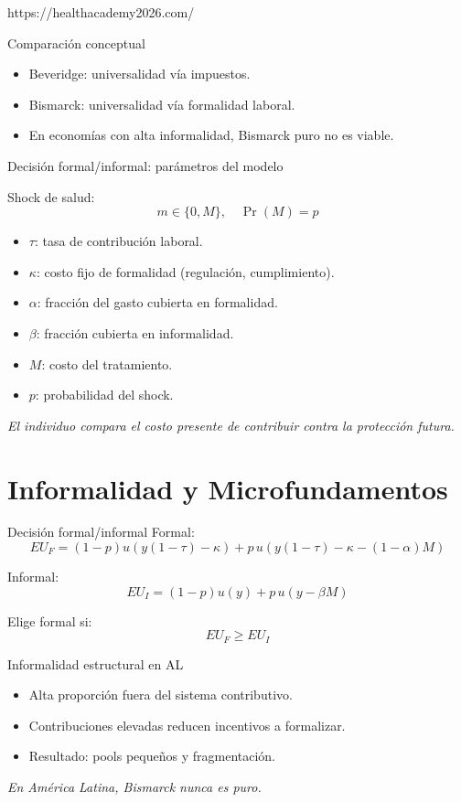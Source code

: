 https://healthacademy2026.com/\documentclass[10pt]{beamer}
\begin{document}
\begin{frame}{Comparación conceptual}
\begin{itemize}
\item Beveridge: universalidad vía impuestos.
\item Bismarck: universalidad vía formalidad laboral.
\item En economías con alta informalidad, Bismarck puro no es viable.
\end{itemize}
\end{frame}
\begin{frame}{Decisión formal/informal: parámetros del modelo}

Shock de salud:
\[
m \in \{0,M\}, \quad \Pr(M)=p
\]

\begin{itemize}
\item $\tau$: tasa de contribución laboral.
\item $\kappa$: costo fijo de formalidad (regulación, cumplimiento).
\item $\alpha$: fracción del gasto cubierta en formalidad.
\item $\beta$: fracción cubierta en informalidad.
\item $M$: costo del tratamiento.
\item $p$: probabilidad del shock.
\end{itemize}

\bigskip
\emph{El individuo compara el costo presente de contribuir contra la protección futura.}

\end{frame}


\section{Informalidad y Microfundamentos}

\begin{frame}{Decisión formal/informal}
Formal:
\[
EU_F = (1-p)u(y(1-\tau)-\kappa)
+ p\,u(y(1-\tau)-\kappa-(1-\alpha)M)
\]

Informal:
\[
EU_I = (1-p)u(y)
+ p\,u(y-\beta M)
\]

Elige formal si:
\[
EU_F \ge EU_I
\]
\end{frame}

\begin{frame}{Informalidad estructural en AL}
\begin{itemize}
\item Alta proporción fuera del sistema contributivo.
\item Contribuciones elevadas reducen incentivos a formalizar.
\item Resultado: pools pequeños y fragmentación.
\end{itemize}

\bigskip
\emph{En América Latina, Bismarck nunca es puro.}
\end{frame}
\end{document}
